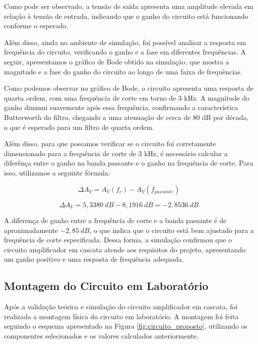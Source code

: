 
Como pode ser observado, a tensão de saída apresenta uma amplitude elevada em relação à tensão de entrada, indicando que o ganho do circuito está funcionando conforme o esperado.

Além disso, ainda no ambiente de simulação, foi possível analisar a resposta em frequência do circuito, verificando o ganho e a fase em diferentes frequências. A seguir, apresentamos o gráfico de Bode obtido na simulação, que mostra a magnitude e a fase do ganho do circuito ao longo de uma faixa de frequências.


Como podemos observar no gráfico de Bode, o circuito apresenta uma resposta de quarta ordem, com uma frequência de corte em torno de 3 kHz. A magnitude do ganho diminui suavemente após essa frequência, confirmando a característica Butterworth do filtro, chegando a uma atenuação de cerca de 80 dB por década, o que é esperado para um filtro de quarta ordem.

Além disso, para que possamos verificar se o circuito foi corretamente dimensionado para a frequência de corte de 3 kHz, é necessário calcular a diferênça entre o ganho na banda passante e o ganho na frequência de corte. Para isso, utilizamos a seguinte fórmula:

\begin{equation}
    \Delta A_V = A_V(f_c) - A_V(f_{passante})
\end{equation}

\begin{equation}
    \Delta A_V = 5,3380~dB - 8,1916~dB = -2,8536~dB
\end{equation}

A diferença de ganho entre a frequência de corte e a banda passante é de aproximadamente $-2,85~dB$, o que indica que o circuito está bem ajustado para a frequência de corte especificada. Dessa forma, a simulação confirmou que o circuito amplificador em cascata atende aos requisitos do projeto, apresentando um ganho positivo e uma resposta de frequência adequada.

\subsection{Montagem do Circuito em Laboratório}
Após a validação teórica e simulação do circuito amplificador em cascata, foi realizada a montagem física do circuito em laboratório. A montagem foi feita seguindo o esquema apresentado na Figura \ref{fig:circuito_proposto}, utilizando os componentes selecionados e os valores calculados anteriormente.

